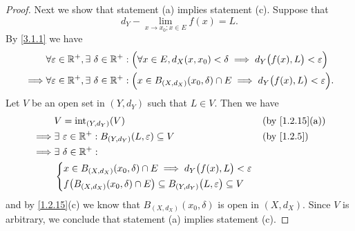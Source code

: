 \begin{proof}
  Next we show that statement (a) implies statement (c).
  Suppose that
  \[
    d_Y - \lim_{x \to x_0 ; x \in E} f(x) = L.
  \]
  By \cref{3.1.1} we have
  \begin{align*}
             & \forall \varepsilon \in \mathbb{R}^+, \exists\ \delta \in \mathbb{R}^+ : \Big(\forall x \in E, d_X(x, x_0) < \delta \implies d_Y\big(f(x), L\big) < \varepsilon\Big)   \\
    \implies & \forall \varepsilon \in \mathbb{R}^+, \exists\ \delta \in \mathbb{R}^+ : \Big(x \in B_{(X, d_X)}(x_0, \delta) \cap E \implies d_Y\big(f(x), L\big) < \varepsilon\Big).
  \end{align*}
  Let \(V\) be an open set in \((Y, d_Y)\) such that \(L \in V\).
  Then we have
  \begin{align*}
             & V = \text{int}_{(Y, d_Y)}(V)                                                                           &  & \text{(by \cref{1.2.15}(a))} \\
    \implies & \exists\ \varepsilon \in \R^+ : B_{(Y, d_Y)}(L, \varepsilon) \subseteq V                               &  & \text{(by \cref{1.2.5})}     \\
    \implies & \exists\ \delta \in \R^+ :                                                                                                               \\
             & \begin{dcases}
                 x \in B_{(X, d_X)}(x_0, \delta) \cap E \implies d_Y\big(f(x), L\big) < \varepsilon \\
                 f\big(B_{(X, d_X)}(x_0, \delta) \cap E\big) \subseteq B_{(Y, d_Y)}\big(L, \varepsilon\big) \subseteq V
               \end{dcases}
  \end{align*}
  and by \cref{1.2.15}(c) we know that \(B_{(X, d_X)}(x_0, \delta)\) is open in \((X, d_X)\).
  Since \(V\) is arbitrary, we conclude that statement (a) implies statement (c).


\end{proof}
